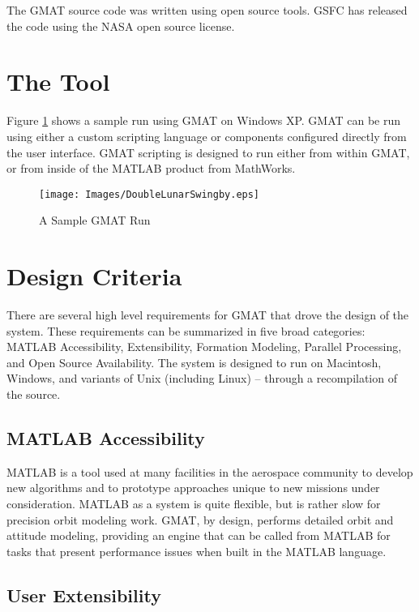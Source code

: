 The GMAT source code was written using open source tools.  GSFC has released the code using the
NASA open source license.

\section{The Tool}

Figure \ref{DLS_Sample} shows a sample run using GMAT on Windows XP.  GMAT can be run using either a
custom scripting language or components configured directly from the user interface.  GMAT scripting
is designed to run either from within GMAT, or from inside of the MATLAB product from MathWorks.

\begin{figure}
\begin{center}
  \texttt{[image: Images/DoubleLunarSwingby.eps]}
  \caption{A Sample GMAT Run}\label{DLS_Sample}
\end{center}
\end{figure}

\section{Design Criteria}

There are several high level requirements for GMAT that drove the design of the system.  These
requirements can be summarized in five broad categories: MATLAB Accessibility, Extensibility,
Formation Modeling, Parallel Processing, and Open Source Availability.  The system is designed to
run on Macintosh, Windows, and variants of Unix (including Linux) -- through a recompilation of the
source.

\subsection{MATLAB Accessibility}

MATLAB is a tool used at many facilities in the aerospace community to develop new algorithms and to
prototype approaches unique to new missions under consideration.  MATLAB as a system is quite
flexible, but is rather slow for precision orbit modeling work.  GMAT, by design, performs detailed
orbit and attitude modeling, providing an engine that can be called from MATLAB for tasks that
present performance issues when built in the MATLAB language.

\subsection{User Extensibility}

